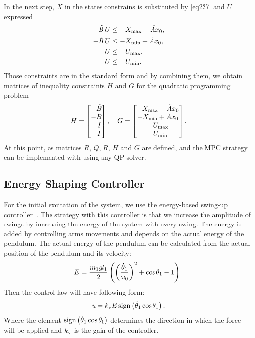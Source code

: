 In the next step, $X$ in the states constrains is substituted by \ref{eq227} and $U$ expressed
\begin{subequations}
	\begin{align}
	\tilde{B}\,U &\leq \ \; \,X _{\text{max}} - \tilde{A}x_0,\\
	-\tilde{B}\,U &\leq -X _{\text{min}} + \tilde{A}x_0,\\
	U &\leq \ \; \,U _{\text{max}},\\
	-U &\leq -U _{\text{min}}.
	\end{align}
\end{subequations}
Those constraints are in the standard form and by combining them, we obtain matrices of inequality constraints $H$ and $G$ for the quadratic programming problem
\begin{equation}
	H = \begin{bmatrix}
	\ \; \,\tilde{B}\\
	-\tilde{B}\\
	\ \ \, I\\
	-I\\
	\end{bmatrix}, \quad
	G = \begin{bmatrix}
	\ \; \,X _{\text{max}} - \tilde{A}x_0\\
	-X _{\text{min}} + \tilde{A}x_0\\
	\ \ \:U _{\text{max}}\\
	-U _{\text{min}}
	\end{bmatrix}.
\end{equation}
At this point, as matrices $R$, $Q$, $R$, $H$ and $G$ are defined, and the MPC strategy can be implemented with using any QP solver.
\subsection{Energy Shaping Controller}\label{energyshapingsection}
For the initial excitation of the system, we use the energy-based swing-up controller~\cite{furuta:swing}. The strategy with this controller is that we increase the amplitude of swings by increasing the energy of the system with every swing. The energy is added by controlling arms movements and depends on the actual energy of the pendulum. The actual energy of the pendulum can be calculated from the actual position of the pendulum and its velocity: 
\begin{equation}\label{energy}
E = \frac{m_1gl_1}{2}\left( \left( \frac{\dot{\theta}_1}{\omega_0} \right)^2+\cos\theta_1 - 1 \right).
\end{equation}
Then the control law will have following form:
\begin{equation}\label{energy-shaping}
	u = k _{\text{v}}E\,\mathrm{sign}\left( \dot{\theta}_1\cos\theta_1 \right).
\end{equation}
Where the element $\mathrm{sign}\left( \dot{\theta}_1\cos\theta_1 \right)$ determines the direction in which the force will be applied and $k _{\text{v}}$ is the gain of the controller.
